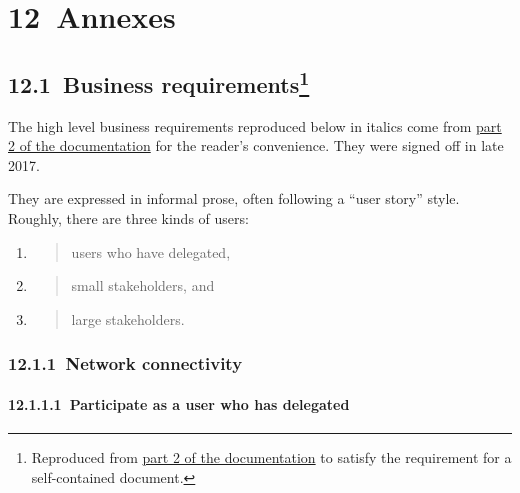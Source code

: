 \documentclass[11pt,a4paper]{article}
\begin{document}
\hypertarget{annexes}{%
\section{​12​~Annexes}\label{annexes}}

\hypertarget{business-requirements}{%
\subsection[​12.1​~Business
requirements]{\texorpdfstring{​12.1​~Business requirements\footnote{Reproduced
  from
  \href{https://github.com/input-output-hk/ouroboros-network-docs/blob/master/technical-report/network.pdf}{{part
  2 of the documentation}} to satisfy the requirement for a
  self-contained document.}}{​12.1​~Business requirements}}\label{business-requirements}}

The high level business requirements reproduced below in italics come
from
\href{https://github.com/input-output-hk/ouroboros-network-docs/blob/master/technical-report/network.pdf}{{part
2 of the documentation}} for the reader's convenience. They were signed
off in late 2017.

They are expressed in informal prose, often following a ``user story''
style. Roughly, there are three kinds of users:

\begin{enumerate}
\def\labelenumi{\arabic{enumi}.}
\item
  \begin{quote}
  users who have delegated,
  \end{quote}
\item
  \begin{quote}
  small stakeholders, and
  \end{quote}
\item
  \begin{quote}
  large stakeholders.
  \end{quote}
\end{enumerate}

\hypertarget{network-connectivity}{%
\subsubsection{​12.1.1​~Network
connectivity}\label{network-connectivity}}

\hypertarget{participate-as-a-user-who-has-delegated}{%
\paragraph{​12.1.1.1​~Participate as a user who has delegated
}\label{participate-as-a-user-who-has-delegated}}
\end{document}
